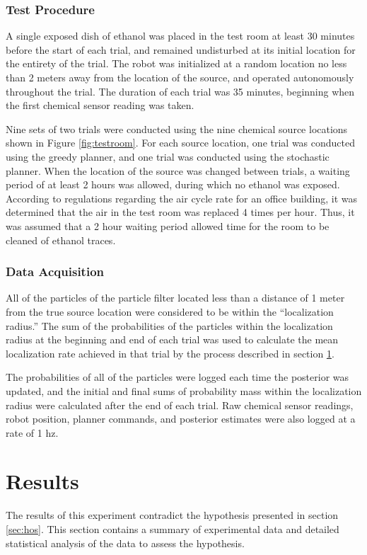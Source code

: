 \documentclass[submit, 12pt]{aiaa-pretty-modified}
\begin{document}
\subsubsection{Test Procedure}
A single exposed dish of ethanol was placed in the test room at least 30
minutes before the start of each trial, and remained undisturbed at
its initial location for the entirety of the trial. The robot was
initialized at a random location no less than 2 meters away from the
location of the source, and operated  autonomously throughout
the trial.  The duration of each trial was 35 minutes, beginning when
the first chemical sensor reading was taken. 

Nine sets of two trials were conducted using the nine chemical source
locations shown in Figure \ref{fig:testroom}.  For each source
location, one trial was conducted using the greedy planner, and one trial
was conducted using the stochastic planner.  When the location of the source was changed between trials, a waiting period of at least 2 hours
was allowed, during which no ethanol was exposed. According to regulations regarding the air
cycle rate for an office building, it was determined that the air in
the test room was replaced 4 times per hour.  Thus, it was assumed that a 2 hour waiting
period allowed time for the room to be cleaned of ethanol traces.

\subsubsection{Data Acquisition}
All of the particles of the particle filter located less than a distance of 1 meter from the
true source location were considered to be within the ``localization
radius.''  The sum of the probabilities of the particles within the
localization radius at the beginning and end of each trial was used to
calculate the mean localization rate achieved in that trial by the
process described in section \ref{sec:results}.

The probabilities of all of the particles were logged each time the
posterior was updated, and the initial and final sums of probability
mass within the localization radius were calculated after the
end of each trial. Raw chemical sensor readings, robot position, planner commands, and
posterior estimates were also logged at a rate of 1 hz.

\newpage

\section{Results}
\label{sec:results}
The results of this experiment contradict the hypothesis presented in
section \ref{sec:hos}.  This section contains  a summary of experimental data
and detailed statistical analysis of the data to assess the
hypothesis.
\end{document}
